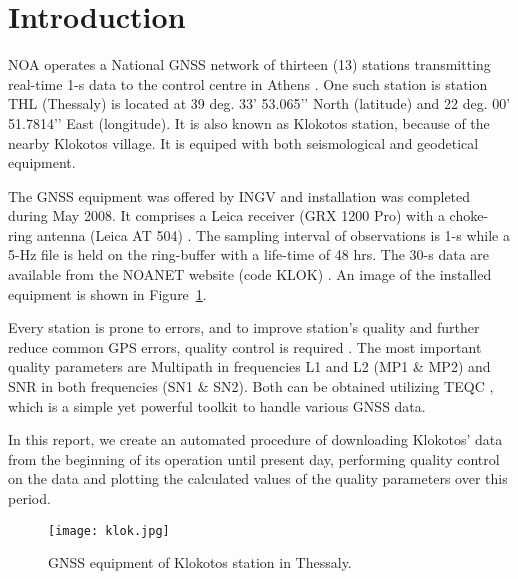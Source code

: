 \documentclass[
12pt, %
a4paper, %
oneside, %
headinclude,footinclude, %
BCOR5mm, %
]{article}
\begin{document}
\pagestyle{scrheadings} %


\section{Introduction}

NOA operates a National GNSS network of thirteen (13) stations transmitting real-time 1-s data to the control centre in Athens \cite{ganas2011noanet}. One such station is station THL (Thessaly) is located at 39 deg. 33’ 53.065’’ North (latitude) and 22 deg. 00’ 51.7814’’ East (longitude). It is also known as Klokotos station, because of the nearby Klokotos village. It is equiped with both seismological and geodetical equipment.

The GNSS equipment was offered by INGV \cite{ingv}  and installation was completed during May 2008. It comprises a Leica receiver (GRX 1200 Pro) with a choke-ring antenna (Leica AT 504) \cite{ganas2008noanet}. The sampling interval of observations is 1-s while a 5-Hz file is held on the ring-buffer with a life-time of 48 hrs. The 30-s data are available from the NOANET website (code KLOK) \cite{noanet}. An image of the installed equipment is shown in Figure~\ref{fig:klok}.

Every station is prone to errors, and to improve station's quality and further reduce common GPS errors, quality control is required \cite{boler2013new, boler2014new}. The most important quality parameters are Multipath in frequencies L1 and L2 (MP1 \& MP2) and SNR in both frequencies (SN1 \& SN2). Both can  be obtained  utilizing TEQC \cite{teqc}, which is a simple yet powerful toolkit to handle various GNSS data.

In this report, we create an automated procedure of downloading Klokotos' data from the beginning of its operation until present day, performing quality control on the data and plotting the calculated values of the quality parameters over this period.

\begin{figure}[h!]
\centering
\texttt{[image: klok.jpg]}
\caption[text]{GNSS equipment of Klokotos station in Thessaly.}
\label{fig:klok}
\end{figure}


\end{document}
